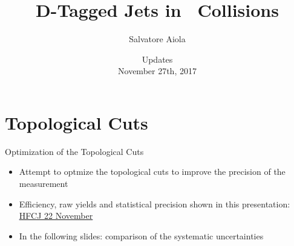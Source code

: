 \documentclass[xcolor={usenames,dvipsnames}, aspectratio=169]{beamer}
\title[D-Tagged Jets in \pp] %
{D-Tagged Jets in \pp\ Collisions}
\author[Salvatore Aiola]%
{Salvatore Aiola}
\institute[Yale University] %
{Yale University}
\date[Updates - Nov. 27th, 2017] %
{Updates \\
November 27th, 2017}
\begin{document}
\begin{frame}
  \titlepage
\end{frame}








\section{Topological Cuts}

\begin{frame}{Optimization of the Topological Cuts}
\begin{itemize}
\item Attempt to optmize the topological cuts to improve the precision of the measurement
\item Efficiency, raw yields and statistical precision shown in this presentation: \textcolor{blue}{\underline{\href{https://indico.cern.ch/event/670521/contributions/2800244/attachments/1563677/2463018/DtaggedJets_SAiola.pdf}{HFCJ 22 November}}}
\item In the following slides: comparison of the systematic uncertainties
\end{itemize}
\end{frame}
\end{document}
